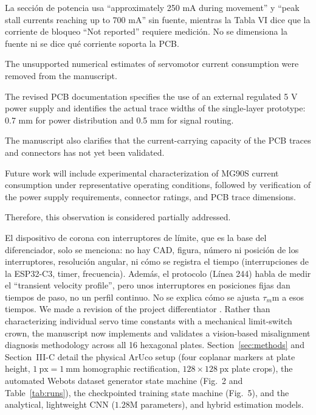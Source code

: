 \documentclass{LabDSTresponse}
\begin{document}
	{La sección de potencia usa “approximately 250 mA during movement” y “peak stall currents reaching up to 700 mA” sin
		fuente, mientras la Tabla VI dice que la corriente de bloqueo “Not reported” requiere medición. No se dimensiona la fuente
		ni se dice qué corriente soporta la PCB.}
	{The unsupported numerical estimates of
		servomotor current consumption were removed
		from the manuscript.
		
		The revised PCB documentation specifies
		the use of an external regulated 5 V power
		supply and identifies the actual trace
		widths of the single-layer prototype:
		0.7 mm for power distribution and 0.5 mm
		for signal routing.
		
		The manuscript also clarifies that the
		current-carrying capacity of the PCB traces
		and connectors has not yet been validated.
		
		Future work will include experimental
		characterization of MG90S current
		consumption under representative operating
		conditions, followed by verification of
		the power supply requirements, connector
		ratings, and PCB trace dimensions.
		
		Therefore, this observation is considered
		partially addressed.}
	
	{El dispositivo de corona con interruptores de límite, que es la base del diferenciador, solo se menciona: no hay CAD, figura,
		número ni posición de los interruptores, resolución angular, ni cómo se registra el tiempo (interrupciones de la ESP32-C3,
		timer, frecuencia). Además, el protocolo (Línea 244) habla de medir el “transient velocity profile”, pero unos interruptores
		en posiciones fijas dan tiempos de paso, no un perfil continuo. No se explica cómo se ajusta $\tau_m$m a esos tiempos.}
	{We made a revision of the project differentiator . Rather than characterizing individual servo time constants with a mechanical limit-switch crown, the manuscript now implements and validates a vision-based misalignment diagnosis methodology across all 16 hexagonal plates. Section~\ref{sec:methods} and Section~III-C detail the physical ArUco setup (four coplanar markers at plate height, $1~\text{px} = 1~\text{mm}$ homographic rectification, $128 \times 128~\text{px}$ plate crops), the automated Webots dataset generator state machine (Fig.~2 and Table~\ref{tab:runs}), the checkpointed training state machine (Fig.~5), and the analytical, lightweight CNN ($1.28\text{M}$ parameters), and hybrid estimation models.}
	
\end{document}
